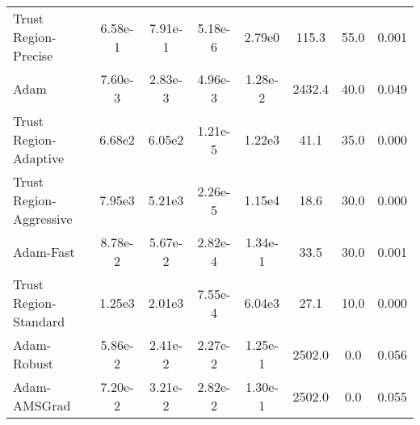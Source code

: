\documentclass{article}
\begin{document}
\begin{table}[htbp]
{\begin{tabular}{p{2.5cm}*{7}{c}}
Trust Region-Precise & 6.58e-1 & 7.91e-1 & 5.18e-6 & 2.79e0 & 115.3 & 55.0 & 0.001 \\
Adam & 7.60e-3 & 2.83e-3 & 4.96e-3 & 1.28e-2 & 2432.4 & 40.0 & 0.049 \\
Trust Region-Adaptive & 6.68e2 & 6.05e2 & 1.21e-5 & 1.22e3 & 41.1 & 35.0 & 0.000 \\
Trust Region-Aggressive & 7.95e3 & 5.21e3 & 2.26e-5 & 1.15e4 & 18.6 & 30.0 & 0.000 \\
Adam-Fast & 8.78e-2 & 5.67e-2 & 2.82e-4 & 1.34e-1 & 33.5 & 30.0 & 0.001 \\
Trust Region-Standard & 1.25e3 & 2.01e3 & 7.55e-4 & 6.04e3 & 27.1 & 10.0 & 0.000 \\
Adam-Robust & 5.86e-2 & 2.41e-2 & 2.27e-2 & 1.25e-1 & 2502.0 & 0.0 & 0.056 \\
Adam-AMSGrad & 7.20e-2 & 3.21e-2 & 2.82e-2 & 1.30e-1 & 2502.0 & 0.0 & 0.055 \\
\bottomrule
\end{tabular}
}
\end{table}
\end{document}
